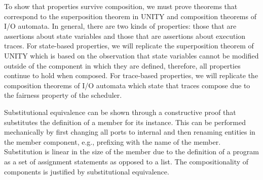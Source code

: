 To show that properties survive composition, we must prove theorems that correspond to the superposition theorem in UNITY and composition theorems of I/O automata.
In general, there are two kinds of properties:  those that are assertions about state variables and those that are assertions about execution traces.
For state-based properties, we will replicate the superposition theorem of UNITY which is based on the observation that state variables cannot be modified outside of the component in which they are defined, therefore, all properties continue to hold when composed.
For trace-based properties, we will replicate the composition theorems of I/O automata which state that traces compose due to the fairness property of the scheduler.

Substitutional equivalence can be shown through a constructive proof that substitutes the definition of a member for its instance.
This can be performed mechanically by first changing all ports to internal and then renaming entities in the member component, e.g., prefixing with the name of the member.
Substitution is linear in the size of the member due to the definition of a program as a set of assignment statements as opposed to a list.
The compositionality of components is justified by substitutional equivalence.


